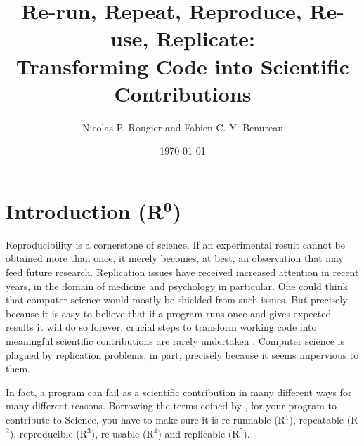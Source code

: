 \documentclass[a4paper,11pt]{article}
\title{Re-run, Repeat, Reproduce, Re-use, Replicate:\\Transforming Code into Scientific Contributions}
\author{Nicolas P. Rougier and Fabien C. Y. Benureau}
\date{\today}
\begin{document}
\maketitle
\section*{Introduction (R$^{\mathbf 0}$)}

Reproducibility is a cornerstone of science. 
% 
% 
% 
% 
% 
% 
%
%
If an experimental result cannot be obtained more than once,
it merely becomes, at best, an observation that
may feed future research. 
Replication issues have received increased attention in recent years,
in the domain of medicine and psychology in particular.
One could think that computer science would mostly be shielded from such issues.
But precisely because it is easy to believe that
if a program runs once and gives expected results it will do so forever, 
crucial steps to transform working code into meaningful scientific contributions are rarely undertaken \citep{Collberg:2016}. 
Computer science is plagued by replication problems,
in part, precisely because it seems impervious to them.

In fact, a program can fail as a scientific contribution
in many different ways for many different reasons.
Borrowing the terms coined by \citeauthor{Goble:2016} \citep{Goble:2016},
for your program to contribute to Science,
you have to make sure it is
re-runnable (R$^1$),
repeatable (R$^2$),
reproducible (R$^3$),
re-usable (R$^4$)
and replicable (R$^5$).\\
\end{document}
